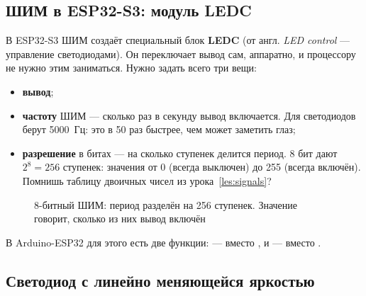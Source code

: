 \subsection{ШИМ в ESP32-S3: модуль LEDC}

В ESP32-S3 ШИМ создаёт специальный блок \textbf{LEDC} (от англ. \emph{LED control} --- управление
светодиодами). Он переключает вывод сам, аппаратно, и процессору не нужно этим заниматься.
Нужно задать всего три вещи:
\begin{itemize}
  \item \textbf{вывод};
  \item \textbf{частоту} ШИМ --- сколько раз в секунду вывод включается. Для светодиодов берут 5000~Гц:
        это в 50 раз быстрее, чем может заметить глаз;
  \item \textbf{разрешение} в битах --- на сколько ступенек делится период. 8 бит дают $2^8 = 256$ ступенек:
        значения от 0 (всегда выключен) до 255 (всегда включён). Помнишь таблицу двоичных чисел из
        урока~\ref{les:signals}?
\end{itemize}

\begin{figure}[H]
\centering
{}
\caption{8-битный ШИМ: период разделён на 256 ступенек. Значение  говорит, сколько из них вывод включён}
\end{figure}

В Arduino-ESP32 для этого есть две функции:  --- вместо
, и  --- вместо .

\subsection{Светодиод с линейно меняющейся яркостью}

